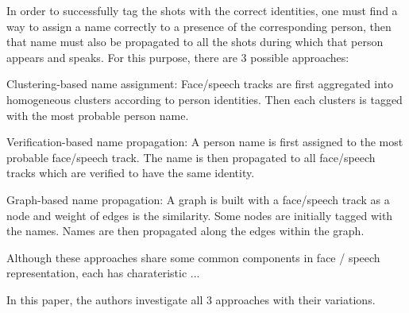 In order to successfully tag the shots with the correct identities, one must find a way to assign a name correctly to a presence of the corresponding person, then that name must also be propagated to all the shots during which that person appears and speaks. For this purpose, there are 3 possible approaches:
\begin{compactitem}
\item{Clustering-based name assignment: Face/speech tracks are first aggregated into homogeneous clusters according to person identities. Then each clusters is tagged with the most probable person name.}
\item{Verification-based name propagation: A person name is first assigned to the most probable face/speech track. The name is then propagated to all face/speech tracks which are verified to have the same identity.}
\item{Graph-based name propagation: A graph is built with a face/speech track as a node and weight of edges is the similarity. Some nodes are initially tagged with the names. Names are then propagated along the edges within the graph.}
\end{compactitem}

Although these approaches share some common components in face / speech representation, each has charateristic ...

In this paper, the authors investigate all 3 approaches with their variations.
\endinput
